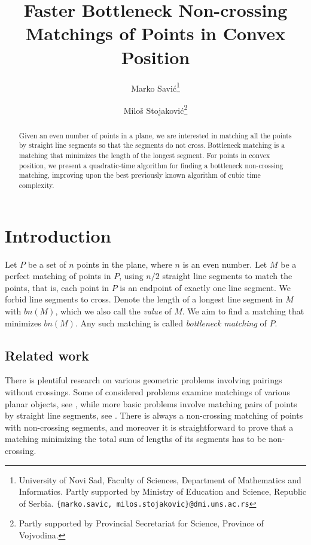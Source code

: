 \documentclass[a4paper, 11pt]{article}
\begin{document}
\title{Faster Bottleneck Non-crossing Matchings of Points in Convex Position}
\date{}


\author{
	Marko Savi\'{c}\footnote{University of Novi Sad, Faculty of Sciences, Department of Mathematics and Informatics. Partly supported by Ministry of Education and Science, Republic of Serbia. {\tt \{marko.savic, milos.stojakovic\}@dmi.uns.ac.rs}}
	\and
	Milo\v{s} Stojakovi\'{c}\footnotemark[1] \footnote{Partly supported by Provincial Secretariat for Science, Province of Vojvodina.}
}

\maketitle

\begin{abstract}
	Given an even number of points in a plane, we are interested in matching all the points by straight line segments so that the segments do not cross. Bottleneck matching is a matching that minimizes the length of the longest segment. For points in convex position, we present a quadratic-time algorithm for finding a bottleneck non-crossing matching, improving upon the best previously known algorithm of cubic time complexity.
\end{abstract}




\section {Introduction}


Let $P$ be a set of $n$ points in the plane, where $n$ is an even number. Let $M$ be a perfect matching of points in $P$, using $n/2$ straight line segments to match the points, that is, each point in $P$ is an endpoint of exactly one line segment. We forbid line segments to cross. Denote the length of a longest line segment in $M$ with $bn(M)$, which we also call the \emph{value} of $M$. We aim to find a matching that minimizes $bn(M)$. Any such matching is called \emph{bottleneck matching} of $P$.

\subsection{Related work}

There is plentiful research on various geometric problems involving pairings without crossings. Some of considered problems examine matchings of various planar objects, see \cite{aloupis2013non, aloupis2015matching, kratochvil2013non}, while more basic problems involve matching pairs of points by straight line segments, see \cite{aichholzer2010edge, aichholzer2009compatible, alon1993long}. There is always a non-crossing matching of points with non-crossing segments, and moreover it is straightforward to prove that a matching minimizing the total sum of lengths of its segments has to be non-crossing.
\end{document}
